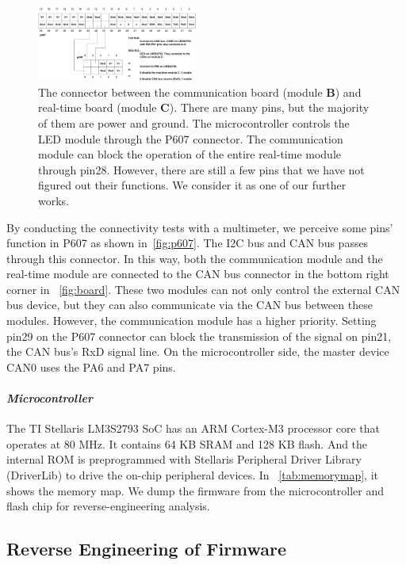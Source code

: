 \begin{figure}[tp!]
	\includegraphics[width=0.47\textwidth]{figures/p607-2}
	\centering
	\caption{The connector between the communication board (module \textbf{B}) and real-time board (module \textbf{C}).  There are many pins, but the majority of them are power and ground. The microcontroller controls the LED module through the P607 connector.  The communication module can block the operation of the entire real-time module through pin28. However, there are still a few pins that we have not figured out their functions. We consider it as one of our further works.}
	\label{fig:p607}
\end{figure}

By conducting the connectivity tests with a multimeter, we perceive some pins' function in P607 as shown in~\autoref{fig:p607}. The I2C bus and CAN bus passes through this connector. In this way, both the communication module and the real-time module are connected to the CAN bus connector in the bottom right corner in ~\autoref{fig:board}. These two modules can not only control the external CAN bus device, but they can also communicate via the CAN bus between these modules. However, the communication module has a higher priority. Setting pin29 on the P607 connector can block the transmission of the signal on pin21, the CAN bus's RxD signal line. On the microcontroller side, the master device CAN0 uses the PA6 and PA7 pins. 

\paragraph{\textbf{\textit{Microcontroller}}} The TI Stellaris LM3S2793 SoC has an ARM Cortex-M3 processor core that operates at 80 MHz. It contains 64 KB SRAM and 128 KB flash. And the internal ROM is preprogrammed with Stellaris Peripheral Driver Library (DriverLib) to drive the on-chip peripheral devices. In ~\autoref{tab:memorymap}, it shows the memory map. We dump the firmware from the microcontroller and flash chip for reverse-engineering analysis.


\subsection{Reverse Engineering of Firmware}


